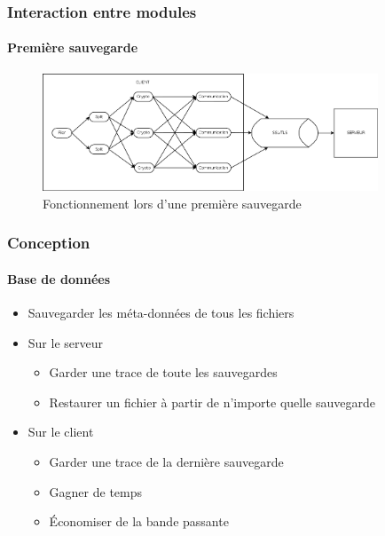 \documentclass{beamer}
\begin{document}
\begin{frame}
 \frametitle{Interaction entre modules}
 \framesubtitle{Premi\`ere sauvegarde}
  \begin{figure}
    \centering
    \includegraphics[width=10cm]{softwareDesign/moduleInteraction.png}
    \caption{Fonctionnement lors d'une premi\`ere sauvegarde}
  \end{figure}
\end{frame}

\begin{frame}
 \frametitle{Conception}
 \framesubtitle{Base de donn\'ees}
 \begin{itemize}
  \item Sauvegarder les m\'eta-donn\'ees de tous les fichiers
  \item Sur le serveur
  \begin{itemize}
   \item Garder une trace de toute les sauvegardes
   \item Restaurer un fichier \`a partir de n'importe quelle sauvegarde
  \end{itemize}
  \item Sur le client
  \begin{itemize}
   \item Garder une trace de la derni\`ere sauvegarde
   \item Gagner de temps
   \item \'Economiser de la bande passante
  \end{itemize}
 \end{itemize}
\end{frame}
\end{document}
